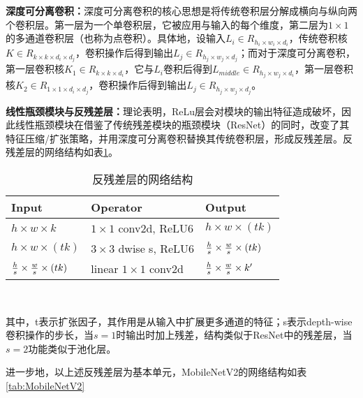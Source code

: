 \textbf{深度可分离卷积：}深度可分离卷积的核心思想是将传统卷积层分解成横向与纵向两个卷积层。第一层为一个单卷积层，它被应用与输入的每个维度，第二层为$1 \times 1$的多通道卷积层（也称为点卷积）。具体地，设输入$L_i \in R_{h_i \times w_i \times d_i}$，传统卷积核$K \in R_{k \times k \times d_i \times d_j}$，卷积操作后得到输出$L_j \in R_{h_j \times w_j \times d_j}$；而对于深度可分离卷积，第一层卷积核$K_1 \in R_{k \times k \times d_i}$，它与$L_i$卷积后得到$L_{middle} \in R_{h_j \times w_j \times d_i}$，第一层卷积核$K_2 \in R_{1 \times 1 \times d_i \times d_j}$，卷积操作后得到输出$L_j \in R_{h_j \times w_j \times d_j}$。

\textbf{线性瓶颈模块与反残差层：}理论表明\cite{Sandler_2018}，ReLu层会对模块的输出特征造成破坏，因此线性瓶颈模块在借鉴了传统残差模块的瓶颈模块（ResNet）的同时，改变了其特征压缩/扩张策略，并用深度可分离卷积替换其传统卷积层，形成反残差层。反残差层的网络结构如表\ref{tab:InverseResidual}。

\begin{table}[htbp]
  \centering
  \caption{反残差层的网络结构}
  \label{tab:InverseResidual}
    \begin{tabular}{p{80pt}p{120pt}p{80pt}}
      \toprule
      Input & Operator & Output\\
      \midrule
      $h \times w \times k$  &  $1 \times 1$ conv2d, ReLU6 &   $h \times w \times (tk)$ \\
      $h \times w \times (tk)$  &  $3 \times 3$ dwise s, ReLU6 & ${h \over s} \times {w \over s} \times (tk)$ \\
      ${h \over s} \times {w \over s} \times (tk)$ &   linear $1 \times 1$ conv2d & ${h \over s} \times {w \over s} \times k'$\\
      \bottomrule
    \end{tabular}\\[5pt]
\end{table}

其中，t表示扩张因子，其作用是从输入中扩展更多通道的特征；s表示depth-wise卷积操作的步长，当$s=1$时输出时加上残差，结构类似于ResNet中的残差层，当$s=2$功能类似于池化层。

进一步地，以上述反残差层为基本单元，MobileNetV2的网络结构如表\ref{tab:MobileNetV2}


